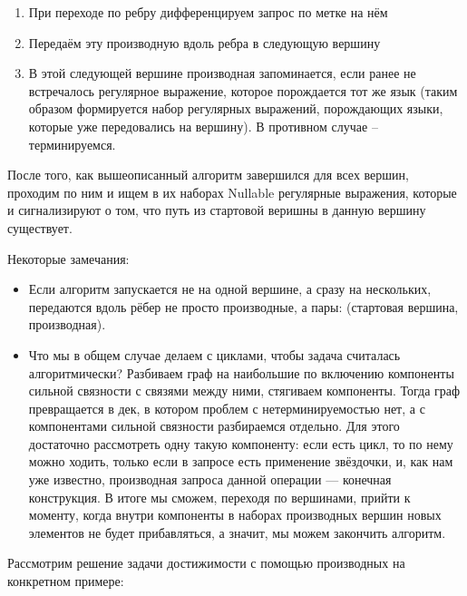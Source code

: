 \begin{enumerate}
    \item При переходе по ребру дифференцируем запрос по метке на нём
    \item Передаём эту производную вдоль ребра в следующую вершину
    \item В этой следующей вершине производная запоминается, если ранее не встречалось регулярное выражение, которое порождается тот же язык (таким образом формируется набор регулярных выражений, порождающих языки, которые уже передовались на вершину). В противном случае -- терминируемся.
\end{enumerate}

После того, как вышеописанный алгоритм завершился для всех вершин, проходим по ним и ищем в их наборах Nullable регулярные выражения, которые и сигнализируют о том, что путь из стартовой веришны в данную вершину существует.

Некоторые замечания:

\begin{itemize}
    \item Если алгоритм запускается не на одной вершине, а сразу на нескольких, передаются вдоль рёбер не просто производные, а пары: (стартовая вершина, производная).
    \item Что мы в общем случае делаем с циклами, чтобы задача считалась алгоритмически? Разбиваем граф на наибольшие по включению компоненты сильной связности с связями между ними, стягиваем компоненты. Тогда граф превращается в дек, в котором проблем с нетерминируемостью нет, а с компонентами сильной связности разбираемся отдельно. Для этого достаточно рассмотреть одну такую компоненту: если есть цикл, то по нему можно ходить, только если в запросе есть применение звёздочки, и, как нам уже известно, производная запроса данной операции --- конечная конструкция. В итоге мы сможем, переходя по вершинами, прийти к моменту, когда внутри компоненты в наборах производных вершин новых элементов не будет прибавляться, а значит, мы можем закончить алгоритм.
\end{itemize}

Рассмотрим решение задачи достижимости с помощью производных на конкретном примере:

